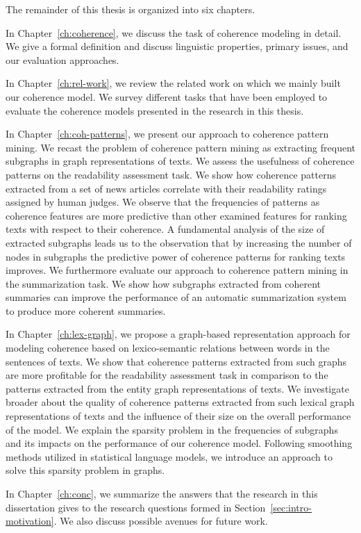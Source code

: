 The remainder of this thesis is organized into six chapters. 

In Chapter~\ref{ch:coherence}, we discuss the task of coherence modeling in detail. 
We give a formal definition and discuss linguistic properties, primary issues, and our evaluation approaches. 

In Chapter~\ref{ch:rel-work}, we review the related work on which we mainly built our coherence model. 
We survey different tasks that have been employed to evaluate the coherence models presented in the research in this thesis. 

In Chapter~\ref{ch:coh-patterns}, we present our approach to coherence pattern mining. 
We recast the problem of coherence pattern mining as extracting frequent subgraphs in graph representations of texts. 
We assess the usefulness of coherence patterns on the readability assessment task. 
We show how coherence patterns extracted from a set of news articles correlate with their readability ratings assigned by human judges. 
We observe that the frequencies of patterns as coherence features are more predictive than other examined features for ranking texts with respect to their coherence. 
A fundamental analysis of the size of extracted subgraphs leads us to the observation that by increasing the number of nodes in subgraphs the predictive power of coherence patterns for ranking texts improves. 
We furthermore evaluate our approach to coherence pattern mining in the summarization task.  
We show how subgraphs extracted from coherent summaries can improve the performance of an automatic summarization system to produce more coherent summaries. 

In Chapter~\ref{ch:lex-graph}, we propose a graph-based representation approach for modeling coherence based on lexico-semantic relations between words in the sentences of texts.  
We show that coherence patterns extracted from such graphs are more profitable for the readability assessment task in comparison to the patterns extracted from the entity graph representations of texts. 
We investigate broader about the quality of coherence patterns extracted from such lexical graph representations of texts and the influence of their size on the overall performance of the model.   
We explain the sparsity problem in the frequencies of subgraphs and its impacts on the performance of our coherence model. 
Following smoothing methods utilized in statistical language models, we introduce an approach to solve this sparsity problem in graphs.  

In Chapter~\ref{ch:conc}, we summarize the answers that the research in this dissertation gives to the research questions formed in Section~\ref{sec:intro-motivation}. 
We also discuss possible avenues for future work. 

